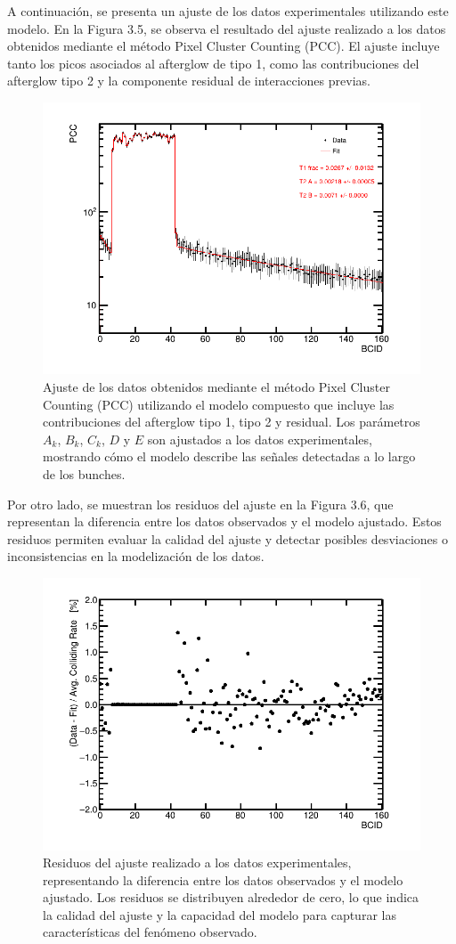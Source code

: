 A continuación, se presenta un ajuste de los datos experimentales utilizando este modelo. En la Figura 3.5, se observa el resultado del ajuste realizado a los datos obtenidos mediante el método Pixel Cluster Counting (PCC). El ajuste incluye tanto los picos asociados al afterglow de tipo 1, como las contribuciones del afterglow tipo 2 y la componente residual de interacciones previas.

\begin{center}
  \begin{figure}[h!]
    \centering
    \includegraphics[width=.55\textwidth]{Chapter3/fitAfterglowTrain_fit.png}
    \caption[Ajuste de los Datos Experimentales]{ Ajuste de los datos obtenidos mediante el método Pixel Cluster Counting (PCC) utilizando el modelo compuesto que incluye las contribuciones del afterglow tipo 1, tipo 2 y residual. Los parámetros $A_{k}$, $B_{k}$, $C_{k}$, $D$ y $E$ son ajustados a los datos experimentales, mostrando cómo el modelo describe las señales detectadas a lo largo de los bunches.} 
    \label{Lumi_2022}
  \end{figure}
\end{center}

Por otro lado, se muestran los residuos del ajuste en la Figura 3.6, que representan la diferencia entre los datos observados y el modelo ajustado. Estos residuos permiten evaluar la calidad del ajuste y detectar posibles desviaciones o inconsistencias en la modelización de los datos.

\begin{center}
  \begin{figure}[h!]
    \centering
    \includegraphics[width=.55\textwidth]{Chapter3/fitAfterglowTrain_residuals.png}
    \caption[Residuos del Ajuste]{Residuos del ajuste realizado a los datos experimentales, representando la diferencia entre los datos observados y el modelo ajustado. Los residuos se distribuyen alrededor de cero, lo que indica la calidad del ajuste y la capacidad del modelo para capturar las características del fenómeno observado.} 
    \label{Lumi_2022}
  \end{figure}
\end{center}

